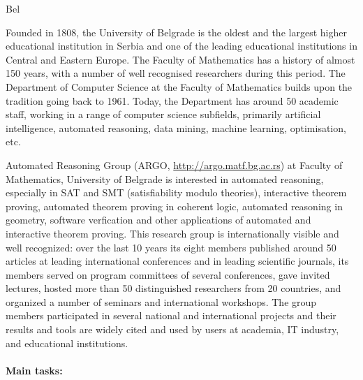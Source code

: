 \begin{sitedescription}{Bel}


  Founded in 1808, the University of Belgrade is the oldest and the
  largest higher educational institution in Serbia and one of the
  leading educational institutions in Central and Eastern Europe. The
  Faculty of Mathematics has a history of almost 150 years, with a
  number of well recognised researchers during this period. The
  Department of Computer Science at the Faculty of Mathematics builds
  upon the tradition going back to 1961. Today, the Department has
  around 50 academic staff, working in a range of computer science
  subfields, primarily artificial intelligence, automated reasoning,
  data mining, machine learning, optimisation, etc.
  
  Automated Reasoning Group (ARGO, \url{http://argo.matf.bg.ac.rs}) at
  Faculty of Mathematics, University of Belgrade is interested in
  automated reasoning, especially in SAT and SMT (satisfiability
  modulo theories), interactive theorem proving, automated theorem
  proving in coherent logic, automated reasoning in geometry, software
  verfication and other applications of automated and interactive
  theorem proving. This research group is internationally visible and
  well recognized: over the last 10 years its eight members published
  around 50 articles at leading international conferences and in
  leading scientific journals, its members served on program
  committees of several conferences, gave invited lectures, hosted
  more than 50 distinguished researchers from 20 countries, and
  organized a number of seminars and international workshops. The
  group members participated in several national and international
  projects and their results and tools are widely cited and used by
  users at academia, IT industry, and educational institutions.

  \paragraph{Main tasks:}

  

\end{sitedescription}
